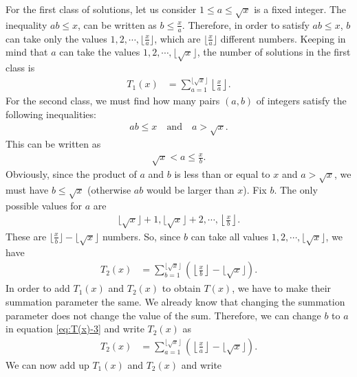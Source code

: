 \documentclass[12pt]{subfile}
\begin{document}
For the first class of solutions, let us consider $1 \leq a \leq \sqrt x$ is a fixed integer. The inequality $ab \leq x$, can be written as $b \leq \frac{x}{a}$. Therefore, in order to satisfy $ab \leq x$, $b$ can take only the values $1, 2,\cdots,\lfloor \frac{x}{a}\rfloor$, which are $\lfloor \frac{x}{a}\rfloor$ different numbers. Keeping in mind that $a$ can take the values $1, 2, \cdots, \lfloor \sqrt x \rfloor$, the number of solutions in the first class is
	\begin{align*}
		T_1(x) &= \sum_{a=1}^{\lfloor\sqrt x\rfloor} \left\lfloor\frac{x}{a}\right\rfloor.
	\end{align*}
For the second class, we must find how many pairs $(a,b)$ of integers satisfy the following inequalities:
	\begin{align*}
		ab \leq x \quad \text{and} \quad a > \sqrt x.
	\end{align*}
This can be written as
	\begin{align*}
		\sqrt x < a \leq \frac{x}{b}. 
	\end{align*}
Obviously, since the product of $a$ and $b$ is less than or equal to $x$ and $a > \sqrt x$, we must have $b \leq \sqrt x$ (otherwise $ab$ would be larger than $x$). Fix $b$. The only possible values for $a$ are
	\begin{align*}
		\lfloor \sqrt x \rfloor +1, \lfloor \sqrt x \rfloor +2, \cdots, \left\lfloor \frac{x}{b}\right\rfloor.
	\end{align*}
These are $\lfloor \frac{x}{b}\rfloor - \lfloor \sqrt x \rfloor$ numbers. So, since $b$ can take all values $1, 2, \cdots, \lfloor \sqrt x \rfloor$, we have
	\begin{align}
		T_2(x) &= \sum_{b=1}^{\lfloor\sqrt x\rfloor} \left(\left\lfloor\frac{x}{b}\right\rfloor - \lfloor \sqrt x \rfloor\right). \label{eq:T(x)-3}
	\end{align}
In order to add $T_1(x)$ and $T_2(x)$ to obtain $T(x)$, we have to make their summation parameter the same. We already know that changing the summation parameter does not change the value of the sum. Therefore, we can change $b$ to $a$ in equation \eqref{eq:T(x)-3} and write $T_2(x)$ as
	\begin{align*}
		T_2(x) &= \sum_{a=1}^{\lfloor\sqrt x\rfloor} \left(\left\lfloor\frac{x}{a}\right\rfloor - \lfloor \sqrt x \rfloor\right).
	\end{align*}
We can now add up $T_1(x)$ and $T_2(x)$ and write
\end{document}
